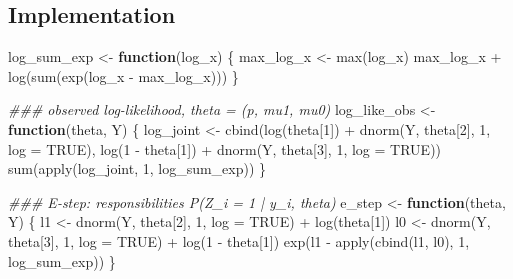 \documentclass[
  letterpaper,
  DIV=11,
  numbers=noendperiod]{scrreprt}
\newenvironment{Shaded}{\begin{snugshade}}{\end{snugshade}}
\newcommand{\AttributeTok}[1]{\textcolor[rgb]{0.40,0.45,0.13}{#1}}
\newcommand{\ConstantTok}[1]{\textcolor[rgb]{0.56,0.35,0.01}{#1}}
\newcommand{\ControlFlowTok}[1]{\textcolor[rgb]{0.00,0.23,0.31}{\textbf{#1}}}
\newcommand{\DecValTok}[1]{\textcolor[rgb]{0.68,0.00,0.00}{#1}}
\newcommand{\DocumentationTok}[1]{\textcolor[rgb]{0.37,0.37,0.37}{\textit{#1}}}
\newcommand{\FunctionTok}[1]{\textcolor[rgb]{0.28,0.35,0.67}{#1}}
\newcommand{\NormalTok}[1]{\textcolor[rgb]{0.00,0.23,0.31}{#1}}
\newcommand{\OtherTok}[1]{\textcolor[rgb]{0.00,0.23,0.31}{#1}}
\newcommand{\SpecialCharTok}[1]{\textcolor[rgb]{0.37,0.37,0.37}{#1}}
\begin{document}
\subsection{Implementation}\label{implementation-1}

\begin{Shaded}
\begin{Highlighting}[]
\NormalTok{log\_sum\_exp }\OtherTok{\textless{}{-}} \ControlFlowTok{function}\NormalTok{(log\_x) \{}
\NormalTok{    max\_log\_x }\OtherTok{\textless{}{-}} \FunctionTok{max}\NormalTok{(log\_x)}
\NormalTok{    max\_log\_x }\SpecialCharTok{+} \FunctionTok{log}\NormalTok{(}\FunctionTok{sum}\NormalTok{(}\FunctionTok{exp}\NormalTok{(log\_x }\SpecialCharTok{{-}}\NormalTok{ max\_log\_x)))}
\NormalTok{\}}

\DocumentationTok{\#\#\# observed log{-}likelihood, theta = (p, mu1, mu0)}
\NormalTok{log\_like\_obs }\OtherTok{\textless{}{-}} \ControlFlowTok{function}\NormalTok{(theta, Y) \{}
\NormalTok{    log\_joint }\OtherTok{\textless{}{-}} \FunctionTok{cbind}\NormalTok{(}\FunctionTok{log}\NormalTok{(theta[}\DecValTok{1}\NormalTok{])     }\SpecialCharTok{+} \FunctionTok{dnorm}\NormalTok{(Y, theta[}\DecValTok{2}\NormalTok{], }\DecValTok{1}\NormalTok{, }\AttributeTok{log =} \ConstantTok{TRUE}\NormalTok{),}
                       \FunctionTok{log}\NormalTok{(}\DecValTok{1} \SpecialCharTok{{-}}\NormalTok{ theta[}\DecValTok{1}\NormalTok{]) }\SpecialCharTok{+} \FunctionTok{dnorm}\NormalTok{(Y, theta[}\DecValTok{3}\NormalTok{], }\DecValTok{1}\NormalTok{, }\AttributeTok{log =} \ConstantTok{TRUE}\NormalTok{))}
    \FunctionTok{sum}\NormalTok{(}\FunctionTok{apply}\NormalTok{(log\_joint, }\DecValTok{1}\NormalTok{, log\_sum\_exp))}
\NormalTok{\}}

\DocumentationTok{\#\#\# E{-}step: responsibilities P(Z\_i = 1 | y\_i, theta)}
\NormalTok{e\_step }\OtherTok{\textless{}{-}} \ControlFlowTok{function}\NormalTok{(theta, Y) \{}
\NormalTok{    l1 }\OtherTok{\textless{}{-}} \FunctionTok{dnorm}\NormalTok{(Y, theta[}\DecValTok{2}\NormalTok{], }\DecValTok{1}\NormalTok{, }\AttributeTok{log =} \ConstantTok{TRUE}\NormalTok{) }\SpecialCharTok{+} \FunctionTok{log}\NormalTok{(theta[}\DecValTok{1}\NormalTok{])}
\NormalTok{    l0 }\OtherTok{\textless{}{-}} \FunctionTok{dnorm}\NormalTok{(Y, theta[}\DecValTok{3}\NormalTok{], }\DecValTok{1}\NormalTok{, }\AttributeTok{log =} \ConstantTok{TRUE}\NormalTok{) }\SpecialCharTok{+} \FunctionTok{log}\NormalTok{(}\DecValTok{1} \SpecialCharTok{{-}}\NormalTok{ theta[}\DecValTok{1}\NormalTok{])}
    \FunctionTok{exp}\NormalTok{(l1 }\SpecialCharTok{{-}} \FunctionTok{apply}\NormalTok{(}\FunctionTok{cbind}\NormalTok{(l1, l0), }\DecValTok{1}\NormalTok{, log\_sum\_exp))}
\NormalTok{\}}


\end{Highlighting}
\end{Shaded}
\end{document}
